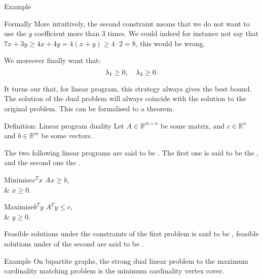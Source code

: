\documentclass[a4paper]{article}
\begin{document}
\begin{parag}{Example}
\begin{subparag}{Formally}
        More intuitively, the second constraint means that we do not want to use the $y$ coefficient more than $3$ times. We could indeed for instance not say that $7x + 3y \geq 4x + 4y = 4\left(x + y\right) \geq 4\cdot 2 = 8$, this would be wrong.
        
        We moreover finally want that: 
        \[\lambda_1 \geq 0, \quad \lambda_2 \geq 0.\]

        It turns our that, for linear program, this strategy always gives the best bound. The solution of the dual problem will always coincide with the solution to the original problem. This can be formalised to a theorem.
    \end{subparag}
\end{parag}

\begin{parag}{Definition: Linear program duality}
    Let $A \in \mathbb{R}^{m \times n}$ be some matrix, and $c \in \mathbb{R}^{n}$ and $b \in \mathbb{R}^{m}$ be some vectors.

    The two following linear programs are said to be . The first one is said to be the , and the second one the .
    \begin{center}
    \begin{minipage}{0.25\textwidth}
    \begin{linearprogram}{Minimise}{$c^T x$}
        $A x \geq b$, \\
        & $x \geq 0$.
    \end{linearprogram}
    \end{minipage}
    \hspace{0.1\textwidth}
    \begin{minipage}{0.25\textwidth}
    \begin{linearprogram}{Maximise}{$b^T y$}
        $A^T y \leq c$, \\
        & $y \geq 0$.
    \end{linearprogram}
    \end{minipage}
    \end{center}

    Feasible solutions under the constraints of the first problem is said to be , feasible solutions under of the second are said to be .
\end{parag}

\begin{parag}{Example}
    On bipartite graphs, the strong dual linear problem to the maximum cardinality matching problem is the minimum cardinality vertex cover.
\end{parag}
\end{document}
